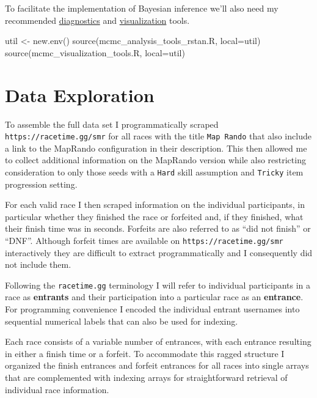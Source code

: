 \documentclass[
  letterpaper,
  DIV=11,
  numbers=noendperiod]{scrartcl}
\newenvironment{Shaded}{\begin{snugshade}}{\end{snugshade}}
\newcommand{\AttributeTok}[1]{\textcolor[rgb]{0.40,0.45,0.13}{#1}}
\newcommand{\FunctionTok}[1]{\textcolor[rgb]{0.28,0.35,0.67}{#1}}
\newcommand{\NormalTok}[1]{\textcolor[rgb]{0.00,0.23,0.31}{#1}}
\newcommand{\OtherTok}[1]{\textcolor[rgb]{0.00,0.23,0.31}{#1}}
\newcommand{\StringTok}[1]{\textcolor[rgb]{0.13,0.47,0.30}{#1}}
\begin{document}
To facilitate the implementation of Bayesian inference we'll also need
my recommended
\href{https://github.com/betanalpha/mcmc_diagnostics}{diagnostics} and
\href{https://github.com/betanalpha/mcmc_visualization_tools}{visualization}
tools.

\begin{Shaded}
\begin{Highlighting}[]
\NormalTok{util }\OtherTok{\textless{}{-}} \FunctionTok{new.env}\NormalTok{()}
\FunctionTok{source}\NormalTok{(}\StringTok{\textquotesingle{}mcmc\_analysis\_tools\_rstan.R\textquotesingle{}}\NormalTok{, }\AttributeTok{local=}\NormalTok{util)}
\FunctionTok{source}\NormalTok{(}\StringTok{\textquotesingle{}mcmc\_visualization\_tools.R\textquotesingle{}}\NormalTok{, }\AttributeTok{local=}\NormalTok{util)}
\end{Highlighting}
\end{Shaded}

\section{Data Exploration}\label{sec:data-exploration}

To assemble the full data set I programmatically scraped
\texttt{https://racetime.gg/smr} for all races with the title
\texttt{Map\ Rando} that also include a link to the MapRando
configuration in their description. This then allowed me to collect
additional information on the MapRando version while also restricting
consideration to only those seeds with a \texttt{Hard} skill assumption
and \texttt{Tricky} item progression setting.

For each valid race I then scraped information on the individual
participants, in particular whether they finished the race or forfeited
and, if they finished, what their finish time was in seconds. Forfeits
are also referred to as ``did not finish'' or ``DNF''. Although forfeit
times are available on \texttt{https://racetime.gg/smr} interactively
they are difficult to extract programmatically and I consequently did
not include them.

Following the \texttt{racetime.gg} terminology I will refer to
individual participants in a race as \textbf{entrants} and their
participation into a particular race as an \textbf{entrance}. For
programming convenience I encoded the individual entrant usernames into
sequential numerical labels that can also be used for indexing.

Each race consists of a variable number of entrances, with each entrance
resulting in either a finish time or a forfeit. To accommodate this
ragged structure I organized the finish entrances and forfeit entrances
for all races into single arrays that are complemented with indexing
arrays for straightforward retrieval of individual race information.
\end{document}
